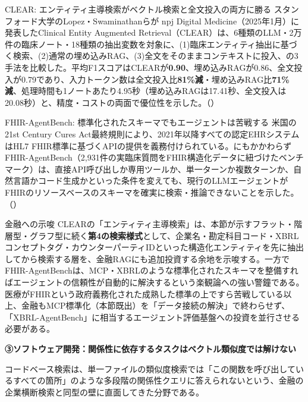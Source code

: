 \begin{casestudy}{CLEAR: エンティティ主導検索がベクトル検索と全文投入の両方に勝る}
スタンフォード大学のLopez・Swaminathanらが npj Digital Medicine（2025年1月）に発表したClinical Entity Augmented Retrieval（CLEAR）は、6種類のLLM・2万件の臨床ノート・18種類の抽出変数を対象に、(1)臨床エンティティ抽出に基づく検索、(2)通常の埋め込みRAG、(3)全文をそのままコンテキストに投入、の3手法を比較した。平均F1スコアはCLEARが\textbf{0.90}、埋め込みRAGが0.86、全文投入が0.79であり、入力トークン数は全文投入比\textbf{81\%減}・埋め込みRAG比\textbf{71\%減}、処理時間も1ノートあたり4.95秒（埋め込みRAGは17.41秒、全文投入は20.08秒）と、精度・コストの両面で優位性を示した。（\cite{y02clear2025}）
\end{casestudy}

\begin{casestudy}{FHIR-AgentBench: 標準化されたスキーマでもエージェントは苦戦する}
米国の21st Century Cures Act最終規則により、2021年以降すべての認定EHRシステムはHL7 FHIR標準に基づくAPIの提供を義務付けられている。にもかかわらずFHIR-AgentBench（2,931件の実臨床質問をFHIR構造化データに紐づけたベンチマーク）は、直接API呼び出しか専用ツールか、単一ターンか複数ターンか、自然言語かコード生成かといった条件を変えても、現行のLLMエージェントがFHIRのリソースベースのスキーマを確実に検索・推論できないことを示した。（\cite{y02fhiragentbench2025}）
\end{casestudy}

\begin{insight}{金融への示唆}
CLEARの「エンティティ主導検索」は、本節が示すフラット・階層型・グラフ型に続く\textbf{第4の検索様式}として、企業名・勘定科目コード・XBRLコンセプトタグ・カウンターパーティIDといった構造化エンティティを先に抽出してから検索する層を、金融RAGにも追加投資する余地を示唆する。一方でFHIR-AgentBenchは、MCP・XBRLのような標準化されたスキーマを整備すればエージェントの信頼性が自動的に解決するという楽観論への強い警鐘である。医療がFHIRという政府義務化された成熟した標準の上ですら苦戦している以上、金融もMCP標準化（本節既出）を「データ接続の解決」で終わらせず、「XBRL-AgentBench」に相当するエージェント評価基盤への投資を並行させる必要がある。
\end{insight}

\textbf{③ソフトウェア開発：関係性に依存するタスクはベクトル類似度では解けない}

コードベース検索は、単一ファイルの類似度検索では「この関数を呼び出しているすべての箇所」のような多段階の関係性クエリに答えられないという、金融の企業横断検索と同型の壁に直面してきた分野である。

